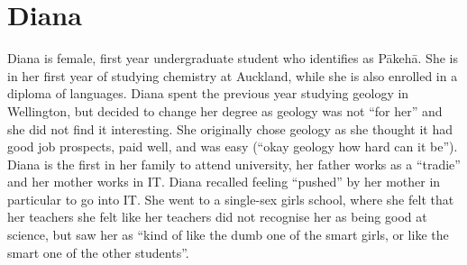 \section*{Diana}
Diana is female, first year undergraduate student who identifies as P\={a}keh\={a}. She is in her first year of studying chemistry at Auckland, while she is also enrolled in a diploma of languages. Diana spent the previous year studying geology in Wellington, but decided to change her degree as geology was not ``for her'' and she did not find it interesting. She originally chose geology as she thought it had good job prospects, paid well, and was easy (``okay geology how hard can it be''). Diana is the first in her family to attend university, her father works as a ``tradie'' and her mother works in IT. Diana recalled feeling ``pushed'' by her mother in particular to go into IT. She went to a single-sex girls school, where she felt that her teachers she felt like her teachers did not recognise her as being good at science, but saw her as ``kind of like the dumb one of the smart girls, or like the smart one of the other students''. 





